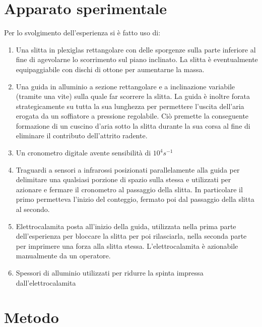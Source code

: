 \documentclass[a4paper,11pt,oneside]{article}
\begin{document}
\section{Apparato sperimentale}\label{section:apparato}
Per lo svolgimento dell'esperienza si è fatto uso di:
\begin{enumerate}
    \item Una slitta in plexiglas rettangolare con delle sporgenze sulla parte inferiore al fine di agevolarne lo scorrimento sul piano inclinato. La slitta è eventualmente equipaggiabile con dischi di ottone per aumentarne la massa.
    \item Una guida in alluminio a sezione rettangolare e a inclinazione variabile (tramite una vite) sulla quale far scorrere la slitta. La guida è inoltre forata strategicamente su tutta la sua lunghezza per permettere l'uscita dell'aria erogata da un soffiatore a pressione regolabile. Ciò premette la conseguente formazione di un cuscino d'aria sotto la slitta durante la sua corsa al fine di eliminare il contributo dell'attrito radente.
    \item Un cronometro digitale avente sensibilità di $10^{4} s^{-1}$
    \item Traguardi a sensori a infrarossi posizionati parallelamente alla guida per delimitare una qualsiasi porzione di spazio sulla stessa e  utilizzati per azionare e fermare il cronometro al passaggio della slitta. In particolare il primo permetteva l'inizio del conteggio, fermato poi dal passaggio della slitta al secondo.
    \item Elettrocalamita posta all'inizio della guida, utilizzata nella prima parte dell'esperienza per bloccare la slitta per poi rilasciarla, nella seconda parte  per imprimere una forza  alla slitta stessa. L'elettrocalamita è azionabile manualmente da un operatore.
    \item Spessori di alluminio utilizzati per ridurre la spinta impressa dall'elettrocalamita
\end{enumerate}
    


\section{Metodo}
\end{document}

